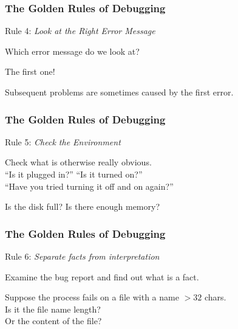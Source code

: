 \begin{frame}
\frametitle{The Golden Rules of Debugging}
\begin{changemargin}{1cm}

Rule 4: \emph{Look at the Right Error Message}

Which error message do we look at?

The first one!

Subsequent problems are sometimes caused by the first error.

\end{changemargin}
\end{frame}

\begin{frame}
\frametitle{The Golden Rules of Debugging}
\begin{changemargin}{1cm}

Rule 5: \emph{Check the Environment}

Check what is otherwise really obvious.\\
\quad ``Is it plugged in?'' ``Is it turned on?''\\
\quad ``Have you tried turning it off and on again?''

Is the disk full? Is there enough memory? 

\end{changemargin}
\end{frame}


\begin{frame}
\frametitle{The Golden Rules of Debugging}
\begin{changemargin}{1cm}

Rule 6: \emph{Separate facts from interpretation}

Examine the bug report and find out what is a fact.

Suppose the process fails on a file with a name $>32$ chars.\\
\quad Is it the file name length?\\
\quad Or the content of the file?

\end{changemargin}
\end{frame}

